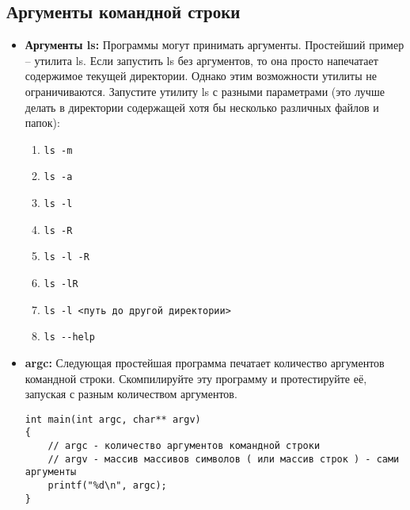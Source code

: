 \documentclass{article}
\begin{document}
\subsection*{Аргументы командной строки}
\begin{itemize}
\item \textbf{Аргументы ls:} Программы могут принимать аргументы. Простейший пример -- утилита ls. Если запустить ls без аргументов, то она просто напечатает содержимое текущей директории. Однако этим возможности утилиты не ограничиваются. Запустите утилиту ls с разными параметрами (это лучше делать в директории содержащей хотя бы несколько различных файлов и папок):
\begin{multicols}{2}
\begin{enumerate}
\item \texttt{ls -m}
\item \texttt{ls -a}
\item \texttt{ls -l}
\item \texttt{ls -R}
\item \texttt{ls -l -R}
\item \texttt{ls -lR}
\item \texttt{ls -l <путь до другой директории>}
\item \texttt{ls -{}-help}
\end{enumerate}
\end{multicols}
\item \textbf{argc:} Следующая простейшая программа печатает количество аргументов командной строки. Скомпилируйте эту программу и протестируйте её, запуская с разным количеством аргументов.
\begin{lstlisting}
int main(int argc, char** argv)
{
	// argc - количество аргументов командной строки
	// argv - массив массивов символов ( или массив строк ) - сами аргументы
	printf("%d\n", argc);
}
\end{lstlisting}


\end{itemize}
\end{document}

